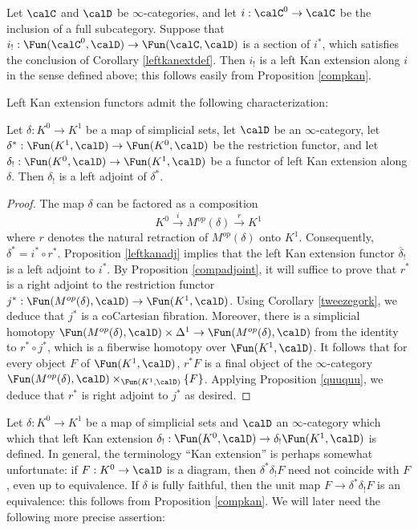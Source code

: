 \begin{example}
Let $\calC$ and $\calD$ be $\infty$-categories, and let
$i: \calC^{0} \rightarrow \calC$ be the inclusion of a full subcategory. Suppose that
$i_{!}: \Fun(\calC^{0}, \calD) \rightarrow \Fun(\calC, \calD)$ is a section of $i^{\ast}$, which satisfies the conclusion of Corollary \ref{leftkanextdef}. Then $i_{!}$ is a left Kan extension along $i$ in the sense defined above; this follows easily from Proposition \ref{compkan}. 
\end{example}

Left Kan extension functors admit the following characterization:

\begin{proposition}\label{charleftkangen}
Let $\delta: K^0 \rightarrow K^1$ be a map of simplicial sets, let $\calD$ be an $\infty$-category, let $\delta^{\ast}: \Fun(K^1,\calD) \rightarrow \Fun(K^0,\calD)$ be the restriction functor, and let
$\delta_{!}: \Fun(K^0,\calD) \rightarrow \Fun(K^1,\calD)$ be a functor of left Kan extension along $\delta$. Then $\delta_{!}$ is a left adjoint of $\delta^{\ast}$.
\end{proposition}

\begin{proof}
The map $\delta$ can be factored as a composition
$$ K^0 \stackrel{i}{\rightarrow} M^{op}(\delta) \stackrel{r}{\rightarrow} K^1$$ where
$r$ denotes the natural retraction of $M^{op}(\delta)$ onto $K^1$. Consequently, $\delta^{\ast} = i^{\ast} \circ r^{\ast}$. Proposition \ref{leftkanadj} implies that the left Kan extension functor $\overline{\delta}_{!}$ is
a left adjoint to $i^{\ast}$. By Proposition \ref{compadjoint}, it will suffice to prove that $r^{\ast}$ is a right adjoint to the restriction functor $j^{\ast}: \Fun(M^{op}(\delta),\calD) \rightarrow \Fun(K^1,\calD)$. 
Using Corollary \ref{tweezegork}, we deduce that $j^{\ast}$ is a coCartesian fibration. Moreover, there is a simplicial homotopy 
$\Fun(M^{op}(\delta), \calD) \times \Delta^1 \rightarrow \Fun(M^{op}(\delta), \calD)$ from the identity to $r^{\ast} \circ j^{\ast}$, which is a fiberwise homotopy over $\Fun(K^1, \calD)$. 
It follows that for every object $F$ of $\Fun(K^1,\calD)$, $r^{\ast} F$ is a final object of the $\infty$-category $\Fun(M^{op}(\delta), \calD) \times_{ \Fun(K^1,\calD)} \{F\}$. Applying Proposition \ref{quuquu}, we deduce that $r^{\ast}$ is right adjoint to $j^{\ast}$ as desired.
\end{proof}

Let $\delta: K^{0} \rightarrow K^{1}$ be a map of simplicial sets and $\calD$ an $\infty$-category which which that left Kan extension $\delta_{!}: \Fun(K^0,\calD) \rightarrow \delta_{!} \Fun(K^1,\calD)$ is defined. In general, the terminology ``Kan extension'' is perhaps somewhat unfortunate: if
$F: K^0 \rightarrow \calD$ is a diagram, then $\delta^{\ast} \delta_{!} F$ need not coincide with $F$, even up to equivalence. If $\delta$ is fully faithful, then the unit map
$F \rightarrow \delta^{\ast} \delta_{!} F$ is an equivalence: this follows from
Proposition \ref{compkan}. We will later need the following more precise assertion:

